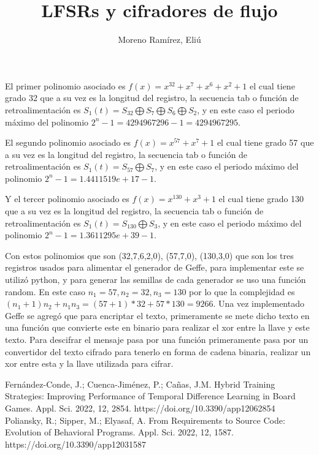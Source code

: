 \documentclass[runningheads]{llncs}
\begin{document}
%
\title{LFSRs y cifradores de flujo}
%
%
\author{Moreno Ramírez, Eliú}
%
%
%
\maketitle              %
El primer polinomio asociado es $f(x)=x^{32}+x^7+x^6+x^2+1$ el cual tiene grado 32 que a su vez es la longitud del registro, la secuencia tab o función de retroalimentación es $S_1(t)=S_{32} \bigoplus S_{7} \bigoplus  S_{6} \bigoplus  S_{2}$, y en este caso el periodo máximo del polinomio  $2^n-1=4294967296-1=4294967295$.

El segundo polinomio asociado es $f(x)=x^{57}+x^7+1$ el cual tiene grado 57 que a su vez es la longitud del registro, la secuencia tab o función de retroalimentación es $S_1(t)=S_{57} \bigoplus S_{7}$, y en este caso el periodo máximo del polinomio  $2^n-1=1.4411519e+17-1$.

Y el tercer polinomio asociado es $f(x)=x^{130}+x^3+1$ el cual tiene grado 130 que a su vez es la longitud del registro, la secuencia tab o función de retroalimentación es $S_1(t)=S_{130} \bigoplus S_{3}$, y en este caso el periodo máximo del polinomio  $2^n-1=1.3611295e+39-1$. 

Con estos polinomios que son (32,7,6,2,0), (57,7,0), (130,3,0) que son los tres registros usados para alimentar el generador de Geffe, para implementar este se utilizó python, y para generar las semillas de cada generador se uso una función random. En este caso $n_1=57, n_2=32, n_3=130$ por lo que la complejidad es $(n_1+1)n_2+n_1n_3=(57+1)*32+57*130=9266$. Una vez implementado Geffe se agregó que para encriptar el texto, primeramente se mete dicho texto en una función que convierte este en binario para realizar el xor entre la llave y este texto. Para descifrar el mensaje pasa por una función primeramente pasa por un convertidor del texto cifrado para tenerlo en forma de cadena binaria, realizar un xor entre esta y la llave utilizada para cifrar. 
%
%
% 
% 
%
\begin{thebibliography}{8}
Fernández-Conde, J.; Cuenca-Jiménez, P.; Cañas, J.M. Hybrid Training Strategies: Improving Performance of Temporal Difference Learning in Board Games. Appl. Sci. 2022, 12, 2854. https://doi.org/10.3390/app12062854
Poliansky, R.; Sipper, M.; Elyasaf, A. From Requirements to Source Code: Evolution of Behavioral Programs. Appl. Sci. 2022, 12, 1587. https://doi.org/10.3390/app12031587

\end{thebibliography}
\end{document}
